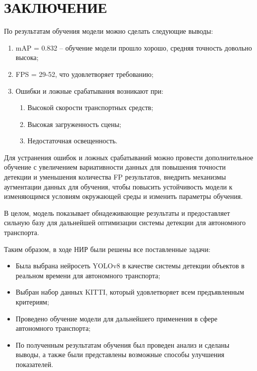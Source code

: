 \chapter*{ЗАКЛЮЧЕНИЕ}

По результатам обучения модели можно сделать следующие выводы:

\begin{enumerate}

	\item mAP = 0.832 – обучение модели прошло хорошо, средняя точность довольно высока;
	\item FPS = 29-52, что удовлетворяет требованию;
	\item Ошибки и ложные срабатывания возникают при:
	
	\begin{enumerate}
		\item Высокой скорости транспортных средств;
		\item Высокая загруженность сцены;
		\item Недостаточная освещенность.
	\end{enumerate}
	
\end{enumerate}

Для устранения ошибок и ложных срабатываний можно провести дополнительное обучение с 
увеличением вариативности данных для повышения точности детекции и уменьшения количества 
FP результатов, внедрить механизмы аугментации данных для обучения, чтобы повысить
устойчивость модели к изменяющимся условиям окружающей среды и изменить параметры обучения.

В целом, модель показывает обнадеживающие результаты и предоставляет сильную базу для дальнейшей оптимизации системы детекции для автономного транспорта.

Таким образом, в ходе НИР были решены все поставленные задачи:

\begin{itemize}

	\item Была выбрана нейросеть YOLOv8 в качестве системы детекции объектов в реальном
	времени для автономного транспорта;
	\item Выбран набор данных KITTI, который удовлетворяет всем предъявленным критериям;
	\item Проведено обучение модели для дальнейшего применения в сфере автономного 
	транспорта;
	\item По полученным результатам обучения был проведен анализ и сделаны выводы, а также
	были представлены возможные способы улучшения показателей. 
	
\end{itemize}